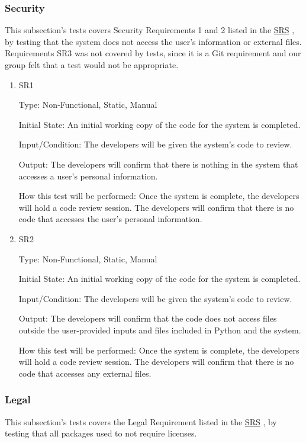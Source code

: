\documentclass[12pt, titlepage]{article}
\begin{document}
\subsubsection{Security}
This subsection's tests covers Security Requirements 1 and 2 listed in the \href{https://github.com/paezha/PyERT-BLACK/blob/main/docs/SRS/SRS.pdf}{SRS} \citep{SRS}, by testing that the system does not access the user's information or external files. Requirements SR3 was not covered by tests, since it is a Git requirement and our group felt that a test would not be appropriate.

\begin{enumerate}

\item{SR1\\}\label{SR1}

Type: Non-Functional, Static, Manual
					
Initial State: 
An initial working copy of the code for the system is completed.

Input/Condition: 
The developers will be given the system's code to review.

Output: The developers will confirm that there is nothing in the system that accesses a user's personal information.

How this test will be performed:  Once the system is complete, the developers will hold a code review session. The developers will confirm that there is no code that accesses the user's personal information.
\\
\item{SR2\\}\label{SR2}

Type: Non-Functional, Static, Manual
					
Initial State: 
An initial working copy of the code for the system is completed.

Input/Condition: 
The developers will be given the system's code to review.

Output: The developers will confirm that the code does not access files outside the user-provided inputs and files included in Python and the system.

How this test will be performed:  Once the system is complete, the developers will hold a code review session. The developers will confirm that there is no code that accesses any external files.

\end{enumerate}

\subsubsection{Legal}
This subsection's tests covers the Legal Requirement listed in the \href{https://github.com/paezha/PyERT-BLACK/blob/main/docs/SRS/SRS.pdf}{SRS} \citep{SRS}, by testing that all packages used to not require licenses.
\end{document}
